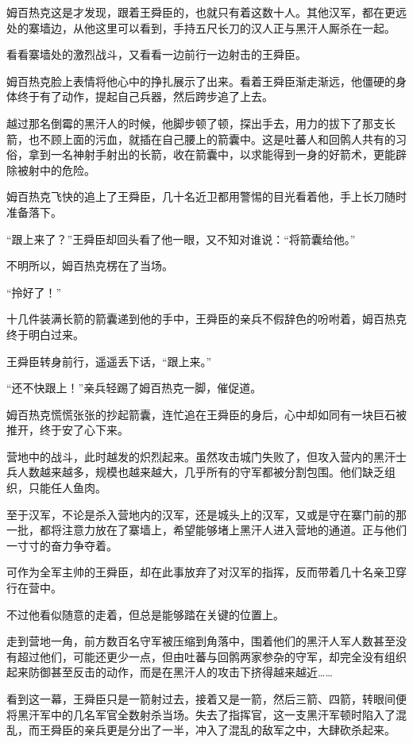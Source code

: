 姆百热克这是才发现，跟着王舜臣的，也就只有着这数十人。其他汉军，都在更远处的寨墙边，从他这里可以看到，手持五尺长刀的汉人正与黑汗人厮杀在一起。

看看寨墙处的激烈战斗，又看看一边前行一边射击的王舜臣。

姆百热克脸上表情将他心中的挣扎展示了出来。看着王舜臣渐走渐远，他僵硬的身体终于有了动作，提起自己兵器，然后跨步追了上去。

越过那名倒霉的黑汗人的时候，他脚步顿了顿，探出手去，用力的拔下了那支长箭，也不顾上面的污血，就插在自己腰上的箭囊中。这是吐蕃人和回鹘人共有的习俗，拿到一名神射手射出的长箭，收在箭囊中，以求能得到一身的好箭术，更能辟除被射中的危险。

姆百热克飞快的追上了王舜臣，几十名近卫都用警惕的目光看着他，手上长刀随时准备落下。

“跟上来了？”王舜臣却回头看了他一眼，又不知对谁说：“将箭囊给他。”

不明所以，姆百热克楞在了当场。

“拎好了！”

十几件装满长箭的箭囊递到他的手中，王舜臣的亲兵不假辞色的吩咐着，姆百热克终于明白过来。

王舜臣转身前行，遥遥丢下话，“跟上来。”

“还不快跟上！”亲兵轻踢了姆百热克一脚，催促道。

姆百热克慌慌张张的抄起箭囊，连忙追在王舜臣的身后，心中却如同有一块巨石被推开，终于安了心下来。

营地中的战斗，此时越发的炽烈起来。虽然攻击城门失败了，但攻入营内的黑汗士兵人数越来越多，规模也越来越大，几乎所有的守军都被分割包围。他们缺乏组织，只能任人鱼肉。

至于汉军，不论是杀入营地内的汉军，还是城头上的汉军，又或是守在寨门前的那一批，都将注意力放在了寨墙上，希望能够堵上黑汗人进入营地的通道。正与他们一寸寸的奋力争夺着。

可作为全军主帅的王舜臣，却在此事放弃了对汉军的指挥，反而带着几十名亲卫穿行在营中。

不过他看似随意的走着，但总是能够踏在关键的位置上。

走到营地一角，前方数百名守军被压缩到角落中，围着他们的黑汗人军人数甚至没有超过他们，可能还更少一点，但由吐蕃与回鹘两家参杂的守军，却完全没有组织起来防御甚至反击的动作，而是在黑汗人的攻击下挤得越来越近……

看到这一幕，王舜臣只是一箭射过去，接着又是一箭，然后三箭、四箭，转眼间便将黑汗军中的几名军官全数射杀当场。失去了指挥官，这一支黑汗军顿时陷入了混乱，而王舜臣的亲兵更是分出了一半，冲入了混乱的敌军之中，大肆砍杀起来。

